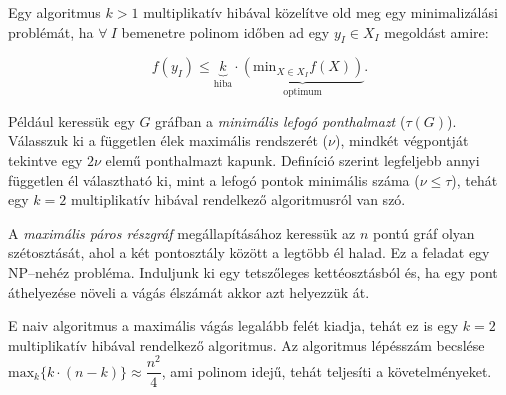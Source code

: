 Egy algoritmus $k>1$ multiplikatív hibával közelítve old meg egy minimalizálási
problémát, ha $\forall~I$ bemenetre polinom időben ad egy $y_I \in X_I$
megoldást amire:


\[
f(y_I) \leq \underbrace{k}_{\mbox{hiba}}  \cdot \underbrace{(\mbox{min}_{X \in X_I} f(X))}_{\mbox{optimum}}.
\]

Például keressük egy $G$ gráfban a \emph{minimális lefogó ponthalmazt} ($\tau(G)$).
Válasszuk ki a független élek maximális rendszerét ($\nu$), mindkét végpontját
tekintve egy $2\nu$ elemű ponthalmazt kapunk. Definíció szerint legfeljebb annyi
független él választható ki, mint a lefogó pontok minimális száma ($\nu \leq
\tau$), tehát egy $k=2$ multiplikatív hibával rendelkező algoritmusról van szó.

A \emph{maximális páros részgráf} megállapításához keressük az $n$ pontú gráf olyan 
szétosztását, ahol a két pontosztály között a legtöbb él halad. Ez a feladat egy
NP--nehéz probléma. Induljunk ki egy tetszőleges kettéosztásból és, ha egy pont
áthelyezése növeli a vágás élszámát akkor azt helyezzük át.

E naiv algoritmus a maximális vágás legalább felét kiadja, tehát ez is egy $k=2$
multiplikatív hibával rendelkező algoritmus. Az algoritmus lépésszám becslése
$\mbox{max}_k\{k\cdot(n-k)\}\approx \dfrac{n^2}{4}$, ami polinom idejű, tehát teljesíti
a követelményeket.
